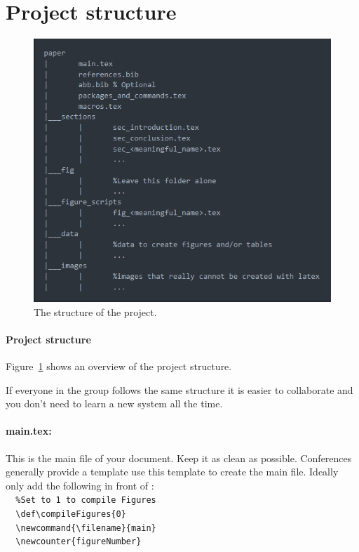 \section{Project structure}\label{sec:projectStructure}

\begin{figure}
	\centering
	\includegraphics[width=\textwidth]{images/project_structure.png}
	\caption{The structure of the project.}
	\label{fig:projectStructure}
\end{figure}

\paragraph{Project structure}
Figure~\ref{fig:projectStructure} shows an overview of the project structure.

\begin{whyblock} If everyone in the group follows the same structure it is easier to collaborate and you don't need to learn a new system all the time.
\end{whyblock}

\paragraph{main.tex:} This is the main file of your document. Keep it as clean as possible. Conferences generally provide a template use this template to create the main file. Ideally only add the following in front of \verb||:	
\verb|	|\\
\verb|	%Set to 1 to compile Figures|\\
\verb|	\def\compileFigures{0}|\\
\verb|	\newcommand{\filename}{main}|\\
\verb|	\newcounter{figureNumber}|\\
\verb|	|\\
\verb|	|\\
\verb|	|\\

